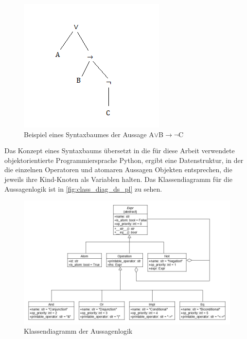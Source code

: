 \begin{figure}[H]
\begin{center}
\includegraphics[scale=1]{images/example_syntax_tree.png}
\caption{Beispiel eines Syntaxbaumes der Aussage A$\vee$B$\rightarrow\neg$C}
\label{fig:example_syntax_tree}
\end{center}
\end{figure}

Das Konzept eines Syntaxbaums übersetzt in die für diese Arbeit verwendete objektorientierte Programmiersprache Python, ergibt eine Datenstruktur, in der die einzelnen Operatoren und atomaren Aussagen Objekten entsprechen, die jeweils ihre Kind-Knoten als Variablen halten. Das Klassendiagramm für die Aussagenlogik ist in \autoref{fig:class_diag_ds_pl} zu sehen.

\begin{figure}[H]
\begin{center}
\includegraphics[scale=0.5]{images/class_diag_ds_pl.png}
\caption{Klassendiagramm der Aussagenlogik}
\label{fig:class_diag_ds_pl}
\end{center}
\end{figure}

